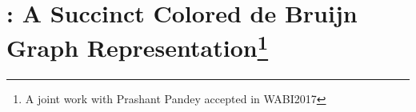  






%
\chapter{\rainbowfish: A Succinct Colored de Bruijn Graph Representation\protect\footnote{A joint work with Prashant Pandey accepted in WABI2017}}
\label{chap:rainbowfish}


